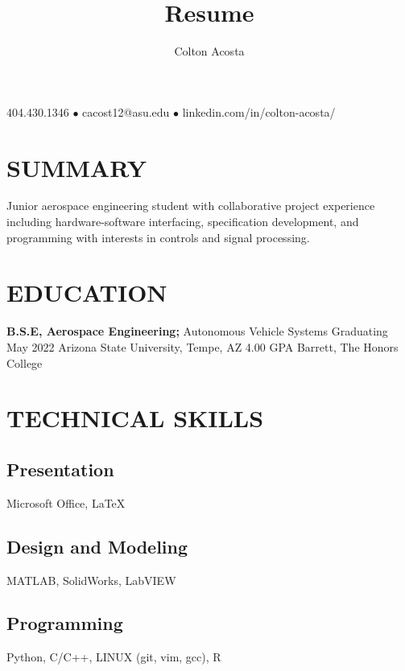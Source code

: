 \documentclass{article}
\makeatletter
\renewcommand{\maketitle}{
	\begin{center}
		{\huge\bfseries
			\theauthor}
			
		404.430.1346 $\bullet$ cacost12@asu.edu $\bullet$  linkedin.com/in/colton-acosta/
	\end{center}
}
\makeatother
\begin{document}
\title{Resume}
\author{Colton Acosta}
\maketitle
\section{SUMMARY}
Junior aerospace engineering student with collaborative project experience including hardware-software interfacing, specification development, and programming with interests in controls and signal processing. 
\section{EDUCATION}
\textbf{B.S.E, Aerospace Engineering;} Autonomous Vehicle Systems
\hfill 
Graduating May 2022
\linebreak
Arizona State University, Tempe, AZ 
\hfill
4.00 GPA
\linebreak
Barrett, The Honors College

\section{TECHNICAL SKILLS}
\subsection{Presentation}
Microsoft Office,  {\LaTeX}
\subsection{Design and Modeling}
MATLAB, SolidWorks, LabVIEW
\subsection{Programming} 
Python, C/C++, LINUX (git, vim, gcc), R
\end{document}
